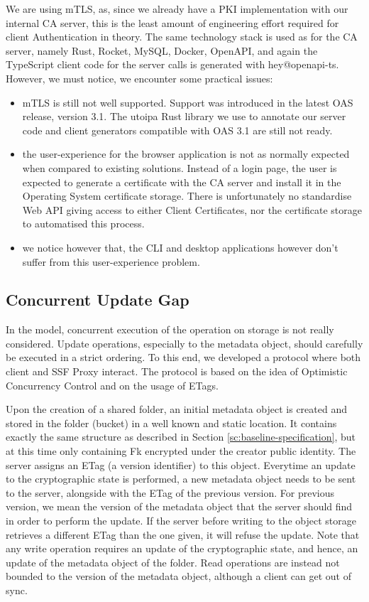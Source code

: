 We are using mTLS, as, since we already have a PKI implementation with our internal CA server, this is the least amount of engineering effort required for client Authentication in theory.
The same technology stack is used as for the CA server, namely Rust, Rocket, MySQL, Docker, OpenAPI, and again the TypeScript client code for the server calls is generated with hey@openapi-ts.
However, we must notice, we encounter some practical issues:
\begin{itemize}
    \item mTLS is still not well supported. Support was introduced in the latest OAS release, version 3.1. The utoipa Rust library we use to annotate our server code and client generators compatible with OAS 3.1 are still not ready.
    \item the user-experience for the browser application is not as normally expected when compared to existing solutions. Instead of a login page, the user is expected to generate a certificate with the CA server and install it in the Operating System certificate storage. There is unfortunately no standardise Web API giving access to either Client Certificates, nor the certificate storage to automatised this process.
    \item we notice however that, the CLI and desktop applications however don't suffer from this user-experience problem.
\end{itemize}

\subsection{Concurrent Update Gap}

In the model, concurrent execution of the operation on storage is not really considered.
Update operations, especially to the metadata object, should carefully be executed in a strict ordering.
To this end, we developed a protocol where both client and SSF Proxy interact.
The protocol is based on the idea of Optimistic Concurrency Control and on the usage of ETags.

Upon the creation of a shared folder, an initial metadata object is created and stored in the folder (bucket) in a well known and static location.
It contains exactly the same structure as described in Section \cref{sc:baseline-specification}, but at this time only containing Fk encrypted under the creator public identity.
The server assigns an ETag (a version identifier) to this object.
Everytime an update to the cryptographic state is performed, a new metadata object needs to be sent to the server, alongside with the ETag of the previous version.
For previous version, we mean the version of the metadata object that the server should find in order to perform the update.
If the server before writing to the object storage retrieves a different ETag than the one given, it will refuse the update.
Note that any write operation requires an update of the cryptographic state, and hence, an update of the metadata object of the folder.
Read operations are instead not bounded to the version of the metadata object, although a client can get out of sync.

